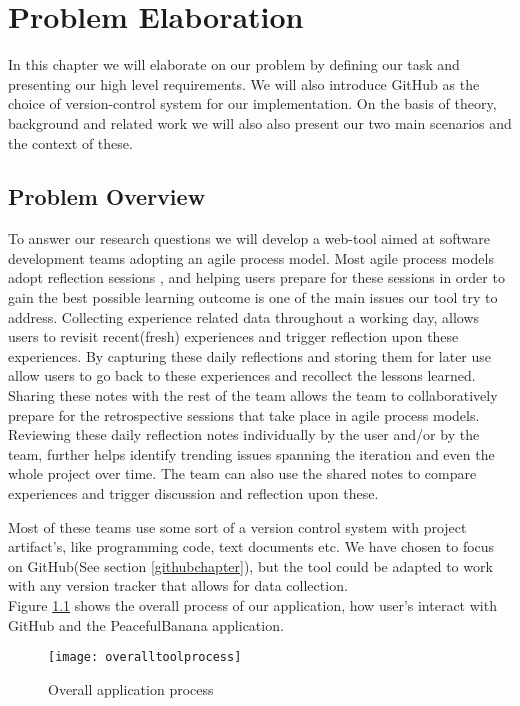 \chapter{Problem Elaboration}
\label{chap:problemelaboration}
\label{problemelaboration}
In this chapter we will elaborate on our problem by defining our task and presenting our high level requirements. We will also introduce GitHub as the choice of version-control system for our implementation.
On the basis of theory, background and related work we will also also present our two main scenarios and the context of these. 

\section{Problem Overview}
\label{problemdefinition}

To answer our research questions we will develop a web-tool aimed at software development teams adopting an agile process model. Most agile process models adopt reflection sessions \citep{retrospectivedzone}, and helping users prepare for these sessions in order to gain the best possible learning outcome is one of the main issues our tool try to address. Collecting experience related data throughout a working day, allows users to revisit recent(fresh) experiences and trigger reflection upon these experiences. By capturing these daily reflections and storing them for later use allow users to go back to these experiences and recollect the lessons learned. Sharing these notes with the rest of the team allows the team to collaboratively prepare for the retrospective sessions that take place in agile process models. Reviewing these daily reflection notes individually by the user and/or by the team, further helps identify trending issues spanning the iteration and even the whole project over time. The team can also use the shared notes to compare experiences and trigger discussion and reflection upon these. 

Most of these teams use some sort of a version control system with project artifact's, like programming code, text documents etc. We have chosen to focus on GitHub(See section \ref{githubchapter}), but the tool could be adapted to work with any version tracker that allows for data collection. \\
Figure \ref{overalltoolprocess} shows the overall process of our application, how user's interact with GitHub and the PeacefulBanana application. 
\begin{figure}[H]
\centering
	\texttt{[image: overalltoolprocess]}
\caption{Overall application process}
\label{overalltoolprocess}
\end{figure}

